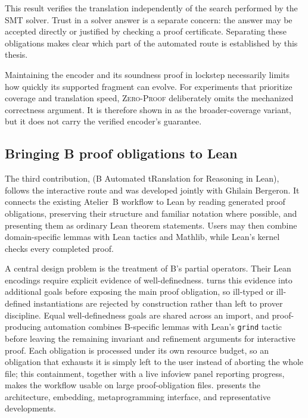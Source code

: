 This result verifies the translation independently of the search performed by
the SMT solver. Trust in a solver answer is a separate concern: the answer may
be accepted directly or justified by checking a proof certificate. Separating
these obligations makes clear which part of the automated route is established
by this thesis.

\begin{quote}\small
\end{quote}

Maintaining the encoder and its soundness proof in lockstep necessarily limits
how quickly its supported fragment can evolve. For experiments that prioritize
coverage and translation speed, \textsc{Zero-Proof} \beer{} deliberately omits
the mechanized correctness argument. It is therefore shown in
 as the broader-coverage variant, but it does
not carry the verified encoder's guarantee.

\subsection{Bringing B proof obligations to Lean}
\label{subsec:intro-contrib-barrel}

The third contribution, \barrel (B Automated tRanslation for Reasoning in Lean),
follows the interactive route and was developed jointly with Ghilain Bergeron.
It connects the existing Atelier~B workflow to Lean by reading generated proof
obligations, preserving their structure and familiar notation where possible,
and presenting them as ordinary Lean theorem statements. Users may then combine
domain-specific lemmas with Lean tactics and Mathlib, while Lean's kernel checks
every completed proof.

A central design problem is the treatment of B's partial operators. Their Lean
encodings require explicit evidence of well-definedness. \barrel turns this
evidence into additional goals before exposing the main proof obligation, so
ill-typed or ill-defined instantiations are rejected by construction rather
than left to prover discipline. Equal well-definedness goals are shared across
an import, and proof-producing automation combines B-specific lemmas with
Lean's \texttt{grind} tactic before leaving the remaining invariant and
refinement arguments for interactive proof. Each obligation is processed under
its own resource budget, so an obligation that exhausts it is simply left to the
user instead of aborting the whole file; this containment, together with a live
infoview panel reporting progress, makes the workflow usable on large
proof-obligation files.  presents the architecture, embedding, metaprogramming
interface, and representative developments.

